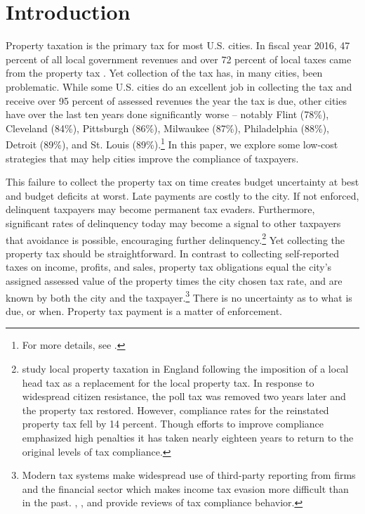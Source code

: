 \documentclass[12pt]{article}
\begin{document}
\newpage

\section{Introduction}


Property taxation is the primary tax for most U.S. cities.  In fiscal
year 2016, 47 percent of all local government revenues and over 72
percent of local taxes came from the property tax
\cite{barnett2013state}.  Yet collection of the tax has, in many
cities, been problematic.  While some U.S. cities do an excellent job
in collecting the tax and receive over 95 percent of assessed revenues
the year the tax is due, other cities have over the last ten years
done significantly worse -- notably Flint (78\%), Cleveland (84\%),
Pittsburgh (86\%), Milwaukee (87\%), Philadelphia (88\%), Detroit
(89\%), and St. Louis (89\%).\footnote{For more details, see
  .}  In this paper, we explore some low-cost
strategies that may help cities improve the compliance of taxpayers.

This failure to collect the property tax on time creates budget
uncertainty at best and budget deficits at worst. Late payments are
costly to the city. If not enforced, delinquent taxpayers may become
permanent tax evaders. Furthermore, significant rates of delinquency
today may become a signal to other taxpayers that avoidance is
possible, encouraging further delinquency.\footnote{
   study local property taxation in England
  following the imposition of a local head tax as a replacement for
  the local property tax. In response to widespread citizen
  resistance, the poll tax was removed two years later and the
  property tax restored. However, compliance rates for the reinstated
  property tax fell by 14 percent. Though efforts to improve
  compliance emphasized high penalties it has taken nearly eighteen
  years to return to the original levels of tax compliance.} Yet
collecting the property tax should be straightforward.  In contrast to
collecting self-reported taxes on income, profits, and sales, property
tax obligations equal the city's assigned assessed value of the
property times the city chosen tax rate, and are known by both the
city and the taxpayer.\footnote{Modern tax systems make widespread use
  of third-party reporting from firms and the financial sector which
  makes income tax evasion more difficult than in the past.
  , , and 
  provide reviews of tax compliance behavior.}  There is no
uncertainty as to what is due, or when. Property tax payment is a
matter of enforcement.
\end{document}
